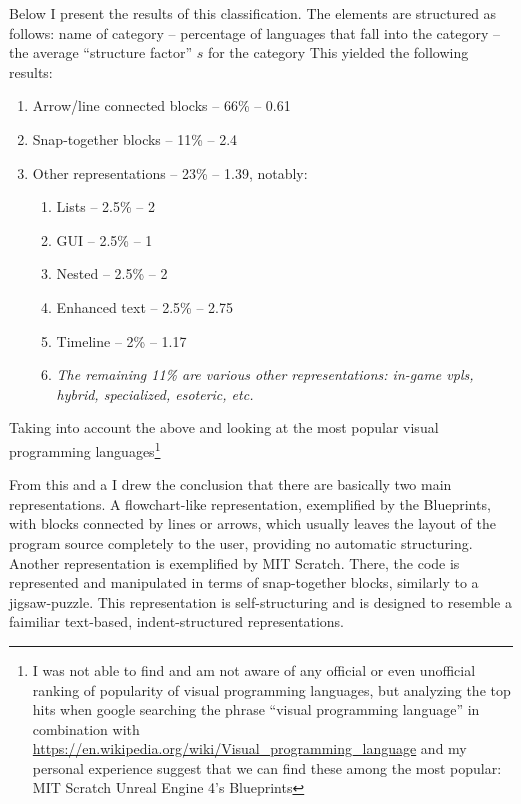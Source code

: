 Below I present the results of this classification. The elements are structured
as follows: name of category -- percentage of languages that fall into the
category -- the average ``structure factor'' $s$ for the category This yielded
the following results:
\begin{enumerate}
    \item Arrow/line connected blocks -- 66\% -- 0.61
    \item Snap-together blocks -- 11\% -- 2.4
    \item Other representations -- 23\% -- 1.39, notably:
    \begin{enumerate}
        \item Lists -- 2.5\% -- 2
        \item GUI -- 2.5\% -- 1
        \item Nested -- 2.5\% -- 2
        \item Enhanced text -- 2.5\% -- 2.75
        \item Timeline -- 2\% -- 1.17
        \item \textit{The remaining 11\% are various other representations:
          in-game \acrshort{vpl}s, hybrid, specialized, esoteric, etc.}
    \end{enumerate}
\end{enumerate}

Taking into account the above and looking at the most popular visual programming
languages\footnote{I was not able to find and am not aware of any official or
  even unofficial ranking of popularity of visual programming languages, but
  analyzing the top hits when google searching the phrase ``visual programming
  language'' in combination with
  \url{https://en.wikipedia.org/wiki/Visual_programming_language} and my
  personal experience suggest that we can find these among the most popular: MIT
  Scratch Unreal Engine 4's Blueprints}

From this and a I drew the conclusion that there are basically two main
representations. A flowchart-like representation, exemplified by the Blueprints,
with blocks connected by lines or arrows, which usually leaves the layout of the
program source completely to the user, providing no automatic
structuring. Another representation is exemplified by MIT Scratch. There, the
code is represented and manipulated in terms of snap-together blocks, similarly
to a jigsaw-puzzle. This representation is self-structuring and is designed to
resemble a faimiliar text-based, indent-structured representations.

